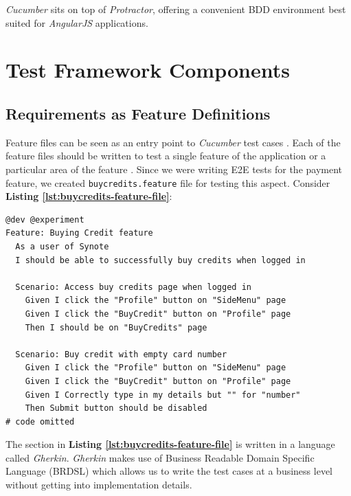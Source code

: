 \textit{Cucumber} sits on top of \textit{Protractor}, offering a convenient BDD environment best suited for \textit{AngularJS} applications.

\section{Test Framework Components}
\label{sec:test-framework-components}

\subsection{Requirements as Feature Definitions}
\label{subsec:feautre-definition-as-requirements}

Feature files can be seen as an entry point to \textit{Cucumber} test cases \cite{featurefile1}. Each of the feature files should be written to test a single feature of the application or a particular area of the feature \cite{featurefile2}. Since we were writing E2E tests for the payment feature, we created \texttt{buycredits.feature} file for testing this aspect. Consider \textbf{Listing \ref{lst:buycredits-feature-file}}:\\

\begin{listing}[H]
\begin{verbatim}
@dev @experiment
Feature: Buying Credit feature
  As a user of Synote
  I should be able to successfully buy credits when logged in

  Scenario: Access buy credits page when logged in
    Given I click the "Profile" button on "SideMenu" page
    Given I click the "BuyCredit" button on "Profile" page
    Then I should be on "BuyCredits" page

  Scenario: Buy credit with empty card number
    Given I click the "Profile" button on "SideMenu" page
    Given I click the "BuyCredit" button on "Profile" page
    Given I Correctly type in my details but "" for "number"
    Then Submit button should be disabled
# code omitted
\end{verbatim}
\label{lst:buycredits-feature-file}
\end{listing}

The section in \textbf{Listing \ref{lst:buycredits-feature-file}} is written in a language called \textit{Gherkin}. \textit{Gherkin} makes use of Business Readable Domain Specific Language (BRDSL) which allows us to write the test cases at a business level without getting into implementation details.\\

